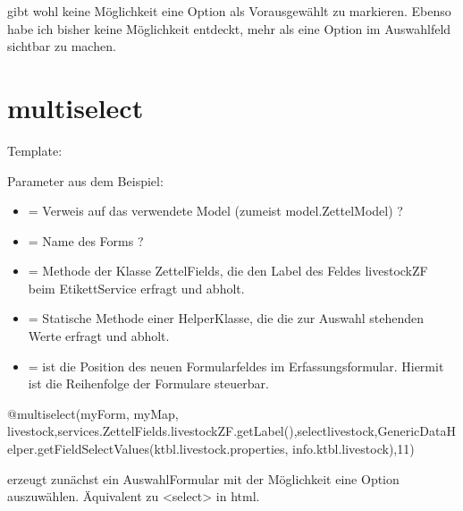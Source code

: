 \documentclass[letterpaper,10pt,ngerman]{sphinxmanual}
\begin{document}
 gibt wohl keine Möglichkeit eine Option als Vorausgewählt zu markieren. Ebenso habe ich bisher keine Möglichkeit entdeckt, mehr als eine Option im Auswahlfeld sichtbar zu machen.


\section{multiselect}
\label{\detokenize{developer-docs/availableForms:multiselect}}
Template: 

Parameter aus dem Beispiel:
\begin{itemize}
\item {} 
 =  Verweis auf das verwendete Model (zumeist model.ZettelModel) ?

\item {} 
 =  Name des Forms ?

\item {} 
 = Methode der Klasse ZettelFields, die den Label des Feldes livestockZF beim Etikett\sphinxhyphen{}Service erfragt und abholt.

\item {} 
 = Statische Methode einer Helper\sphinxhyphen{}Klasse, die die zur Auswahl stehenden Werte erfragt und abholt.

\item {} 
 = ist die Position des neuen Formularfeldes im Erfassungsformular. Hiermit ist die Reihenfolge der Formulare steuerbar.

\end{itemize}

\begin{sphinxVerbatim}[commandchars=\\\{\}]
@multiselect(myForm, myMap, \PYGZdq{}livestock\PYGZdq{},services.ZettelFields.livestockZF.getLabel(),\PYGZdq{}select\PYGZhy{}livestock\PYGZdq{},GenericDataHelper.getFieldSelectValues(\PYGZdq{}ktbl.livestock.properties\PYGZdq{}, \PYGZdq{}info.ktbl.livestock\PYGZdq{}),11)
\end{sphinxVerbatim}

 erzeugt zunächst ein Auswahl\sphinxhyphen{}Formular mit der Möglichkeit eine Option auszuwählen. Äquivalent zu \textless{}select\textgreater{} in html.
\end{document}
